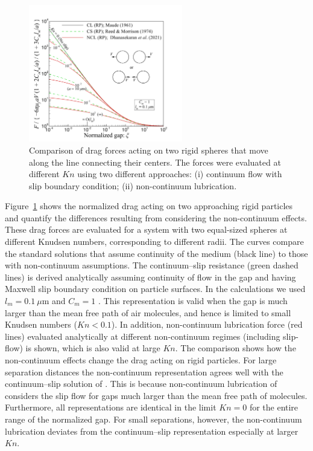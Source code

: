\documentclass[../thesis.tex]{subfiles}
\begin{document}
\begin{figure}%
\center
\includegraphics[trim=05mm 00mm 20mm 15mm, clip, width=0.6\textwidth]{../figs/PRF/fig4.pdf}
\caption{Comparison of drag forces acting on two rigid spheres that move along the line connecting their centers. The forces were evaluated at different $Kn$ using two different approaches: (i) continuum flow with slip boundary condition; (ii) non-continuum lubrication.}
\label{fig:nclmodel}
\end{figure}%


Figure~\ref{fig:nclmodel} shows the normalized drag acting on two approaching rigid particles and quantify the differences resulting from considering the non-continuum effects. These drag forces are evaluated for a system with two equal-sized spheres at different Knudsen numbers, corresponding to different radii. The curves compare the standard solutions that assume continuity of the medium (black line) to those with non-continuum assumptions. The continuum--slip resistance (green dashed lines) is derived analytically assuming continuity of flow in the gap and having Maxwell slip boundary condition on particle surfaces. In the calculations we used $l_m = 0.1~\mu$m and $C_m=1$ \citep{D72}. This representation is valid when the gap is much larger than the mean free path of air molecules, and hence is limited to small Knudsen numbers ($Kn<0.1$). In addition, non-continuum lubrication force (red lines) evaluated analytically at different non-continuum regimes (including slip-flow) is shown, which is also valid at large $Kn$. The comparison shows how the non-continuum effects change the drag acting on rigid particles. For large separation distances the non-continuum representation \citep{SK96,DRK21a} agrees well with the continuum--slip solution of \cite{RM74}. This is because non-continuum lubrication of \cite{SK96} considers the slip flow for gaps much larger than the mean free path of molecules. Furthermore, all representations are identical in the limit $Kn=0$ for the entire range of the normalized gap. For small separations, however, the non-continuum lubrication deviates from the continuum--slip representation especially at larger $Kn$.
\end{document}
